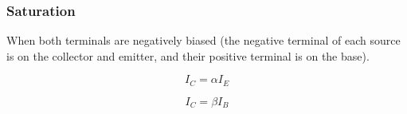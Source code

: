 \subsubsection{Saturation}\label{subsubsec:BJT_Saturation_Region}
When both terminals are negatively biased (the negative terminal of each source is on the collector and emitter, and their positive terminal is on the base).

\begin{equation}\label{eq:BJT_Alpha}
  I_{C} = \alpha I_{E}
\end{equation}


\begin{equation}\label{eq:BJT_Beta}
  I_{C} = \beta I_{B}
\end{equation}


